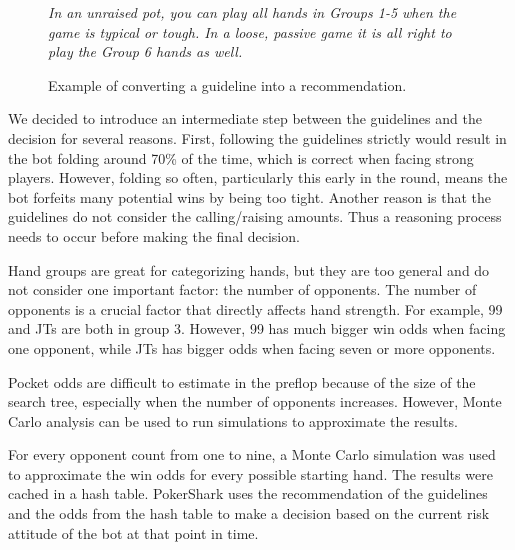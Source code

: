 \begin{figure}[H]
    \centering
    \begin{minipage}{\textwidth}
        \begin{minipage}{0.45\textwidth}
            \textit{In an unraised pot, you can play all hands in Groups 1-5 when the game is typical or tough. In a loose, passive game it is all right to play the Group 6 hands as well.}
        \end{minipage}
        \hspace{0.05\textwidth}
        \begin{minipage}{0.55\textwidth}
            
        \end{minipage}
    \end{minipage}
    \caption{Example of converting a guideline into a recommendation.}
\end{figure}

We decided to introduce an intermediate step between the guidelines and the decision for several reasons. First, following the guidelines strictly would result in the bot folding around 70\% of the time, which is correct when facing strong players. However, folding so often, particularly this early in the round, means the bot forfeits many potential wins by being too tight. Another reason is that the guidelines do not consider the calling/raising amounts. Thus a reasoning process needs to occur before making the final decision.

Hand groups are great for categorizing hands, but they are too general and do not consider one important factor: the number of opponents. The number of opponents is a crucial factor that directly affects hand strength. For example, 99 and JTs are both in group 3. However, 99 has much bigger win odds when facing one opponent, while JTs has bigger odds when facing seven or more opponents.

Pocket odds are difficult to estimate in the preflop because of the size of the search tree, especially when the number of opponents increases. However, Monte Carlo analysis can be used to run simulations to approximate the results.

For every opponent count from one to nine, a Monte Carlo simulation was used to approximate the win odds for every possible starting hand. The results were cached in a hash table. PokerShark uses the recommendation of the guidelines and the odds from the hash table to make a decision based on the current risk attitude of the bot at that point in time.

